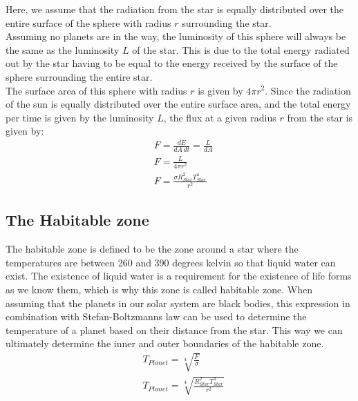\documentclass[reprint,english,notitlepage]{revtex4-2}
\begin{document}
Here, we assume that the radiation from the star is equally distributed over the entire surface of the sphere with radius $r$ surrounding the star.\\
Assuming no planets are in the way, the luminosity of this sphere will always be the same as the luminosity $L$ of the star.
This is due to the total energy radiated out by the star having to be equal to the energy received by the surface of the sphere surrounding the entire star.\\
The surface area of this sphere with radius $r$ is given by $4 \pi r^2$.
Since the radiation of the sun is equally distributed over the entire surface area, and the total energy per time is given by the luminosity $L$, the flux at a given radius $r$ from the star is given by:
\begin{align}
    &F = \frac{dE}{dA \, dt} = \frac{L}{dA}\\
	&F = \frac{L}{4 \pi r^2}\\
	&F = \frac{\sigma R_{Star}^2 T_{Star}^4}{r^2} \label{Flux_Distance}
\end{align}

\subsection{The Habitable zone}\label{subsec:temperature-of-planets}
The habitable zone is defined to be the zone around a star where the temperatures are between 260 and 390 degrees kelvin so that liquid water can exist.
The existence of liquid water is a requirement for the existence of life forms as we know them, which is why this zone is called habitable zone.
When assuming that the planets in our solar system are black bodies, this expression in combination with Stefan-Boltzmanns law can be used to determine the temperature of a planet based on their distance from the star.
This way we can ultimately determine the inner and outer boundaries of the habitable zone.
\begin{align*}
    &T_{Planet} = \sqrt[4]{\frac{F}{\sigma}}\\
	&T_{Planet} = \sqrt[4]{\frac{R_{Star}^2 T_{Star}^4}{r^2}}
\end{align*}
\end{document}
